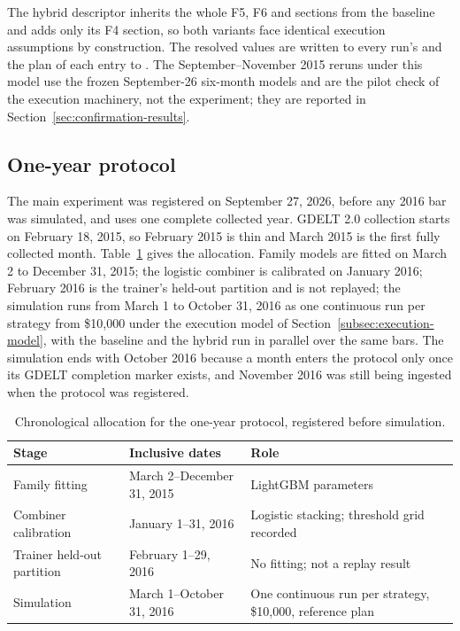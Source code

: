 The hybrid descriptor inherits the whole F5, F6 and  sections from the baseline and adds only its F4 section, so both variants face identical execution assumptions by construction. The resolved values are written to every run's  and the plan of each entry to . The September--November 2015 reruns under this model use the frozen September-26 six-month models and are the pilot check of the execution machinery, not the experiment; they are reported in Section~\ref{sec:confirmation-results}.

\subsection{One-year protocol} \label{subsec:one-year-protocol}

The main experiment was registered on September 27, 2026, before any 2016 bar was simulated, and uses one complete collected year. GDELT 2.0 collection starts on February 18, 2015, so February 2015 is thin and March 2015 is the first fully collected month. Table~\ref{tab:one-year-splits} gives the allocation. Family models are fitted on March 2 to December 31, 2015; the logistic combiner is calibrated on January 2016; February 2016 is the trainer's held-out partition and is not replayed; the simulation runs from March 1 to October 31, 2016 as one continuous run per strategy from \$10,000 under the execution model of Section~\ref{subsec:execution-model}, with the baseline and the hybrid run in parallel over the same bars. The simulation ends with October 2016 because a month enters the protocol only once its GDELT completion marker exists, and November 2016 was still being ingested when the protocol was registered.

\begin{table}[htbp]
\centering
\caption{Chronological allocation for the one-year protocol, registered before simulation.}
\label{tab:one-year-splits}
\small
\begin{tabular}{p{4.0cm}p{4.6cm}p{4.4cm}}
\toprule
\textbf{Stage} & \textbf{Inclusive dates} & \textbf{Role} \\
\midrule
Family fitting & March 2--December 31, 2015 & LightGBM parameters \\
Combiner calibration & January 1--31, 2016 & Logistic stacking; threshold grid recorded \\
Trainer held-out partition & February 1--29, 2016 & No fitting; not a replay result \\
Simulation & March 1--October 31, 2016 & One continuous run per strategy, \$10,000, reference plan \\
\bottomrule
\end{tabular}
\end{table}

